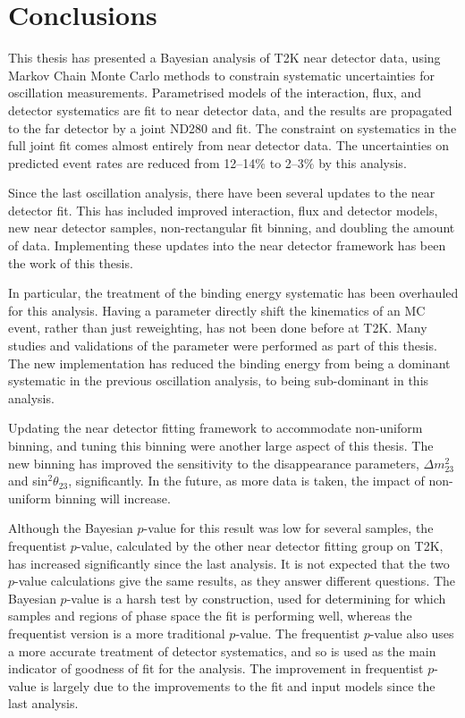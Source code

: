 \chapter{Conclusions}

This thesis has presented a Bayesian analysis of T2K near detector data, using Markov Chain Monte Carlo methods to constrain systematic uncertainties for oscillation measurements. Parametrised models of the interaction, flux, and detector systematics are fit to near detector data, and the results are propagated to the far detector by a joint ND280 and \SK fit. The constraint on systematics in the full joint fit comes almost entirely from near detector data. The uncertainties on predicted \SK event rates are reduced from 12--14$\%$ to 2--3$\%$ by this analysis. 

Since the last oscillation analysis, there have been several updates to the near detector fit. This has included improved interaction, flux and detector models, new near detector samples, non-rectangular fit binning, and doubling the amount of data. Implementing these updates into the near detector framework has been the work of this thesis.

In particular, the treatment of the binding energy systematic has been overhauled for this analysis. Having a parameter directly shift the kinematics of an MC event, rather than just reweighting, has not been done before at T2K. Many studies and validations of the parameter were performed as part of this thesis. The new implementation has reduced the binding energy from being a dominant systematic in the previous oscillation analysis, to being sub-dominant in this analysis.

Updating the near detector fitting framework to accommodate non-uniform binning, and tuning this binning were another large aspect of this thesis. The new binning has improved the sensitivity to the disappearance parameters, $\Delta m^{2}_{23}$ and sin$^2 \theta_{23}$, significantly. In the future, as more data is taken, the impact of non-uniform binning will increase.

Although the Bayesian $p$-value for this result was low for several samples, the frequentist $p$-value, calculated by the other near detector fitting group on T2K, has increased significantly since the last analysis. It is not expected that the two $p$-value calculations give the same results, as they answer different questions. The Bayesian $p$-value is a harsh test by construction, used for determining for which samples and regions of phase space the fit is performing well, whereas the frequentist version is a more traditional $p$-value. The frequentist $p$-value also uses a more accurate treatment of detector systematics, and so is used as the main indicator of goodness of fit for the analysis. The improvement in frequentist $p$-value is largely due to the improvements to the fit and input models since the last analysis.

